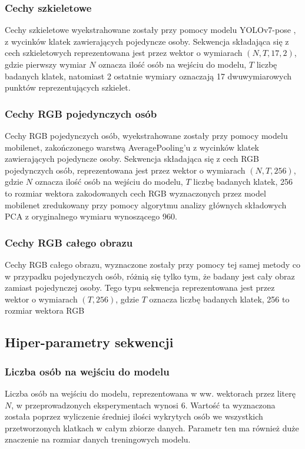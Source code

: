 \subsubsection{Cechy szkieletowe}
Cechy szkieletowe wyekstrahowane zostały przy pomocy modelu YOLOv7-pose \cite{yolov7-pose}, z wycinków klatek
zawierających pojedyncze osoby. Sekwencja składająca się z cech szkieletowych reprezentowana jest przez wektor o
wymiarach $(N, T, 17, 2)$, gdzie pierwszy wymiar $N$ oznacza ilość osób na wejściu do modelu, $T$ liczbę badanych klatek,
natomiast 2 ostatnie wymiary oznaczają 17 dwuwymiarowych punktów reprezentujących szkielet.
\subsubsection{Cechy RGB pojedynczych osób}
Cechy RGB pojedynczych osób, wyekstrahowane zostały przy pomocy modelu mobilenet\cite{mobilenet}, zakończonego warstwą
AveragePooling'u z wycinków klatek zawierających pojedyncze osoby. Sekwencja składająca się z cech RGB pojedynczych
osób, reprezentowana jest przez wektor o wymiarach $(N, T, 256)$, gdzie $N$ oznacza ilość osób na wejściu do modelu, $T$ liczbę badanych klatek, 256 to rozmiar wektora zakodowanych cech RGB wyznaczonych przez model mobilenet zredukowany przy
pomocy algorytmu analizy głównych składowych PCA z oryginalnego wymiaru wynoszącego 960.  
\subsubsection{Cechy RGB całego obrazu}\label{sekwncje-klatek}
Cechy RGB całego obrazu, wyznaczone zostały przy pomocy tej samej metody co w przypadku pojedynczych osób, różnią
się tylko tym, że badany jest cały obraz zamiast pojedynczej osoby. Tego typu sekwencja reprezentowana jest przez wektor
o wymiarach $(T, 256)$, gdzie $T$ oznacza liczbę badanych klatek, 256 to rozmiar wektora RGB ~
\subsection{Hiper-parametry sekwencji}
\subsubsection{Liczba osób na wejściu do modelu}\label{kryteria-wyboru}
Liczba osób na wejściu do modelu,
reprezentowana w ww. wektorach przez literę $N$, w przeprowadzonych eksperymentach wynosi 6. Wartość ta wyznaczona została
poprzez wyliczenie średniej ilości wykrytych osób we wszystkich przetworzonych klatkach w całym zbiorze danych. Parametr ten ma również duże znaczenie na rozmiar danych treningowych modelu. 

